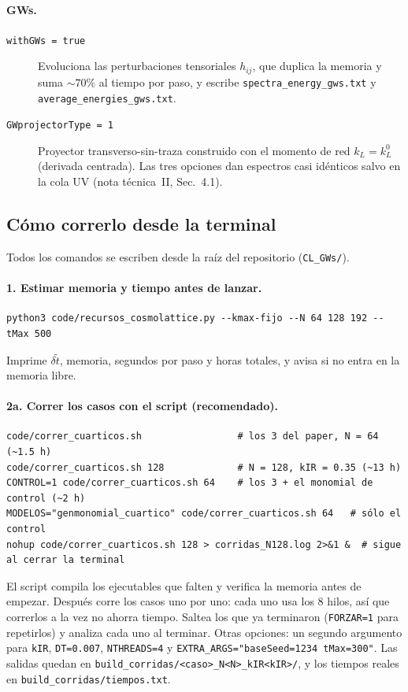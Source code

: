 \documentclass[11pt]{article}
\begin{document}
            \paragraph{GWs.}
            \begin{description}
                \item[\texttt{withGWs = true}] Evoluciona las perturbaciones tensoriales $h_{ij}$, que duplica la memoria y suma $\sim 70\%$ al tiempo por paso, y escribe \texttt{spectra\_energy\_gws.txt} y \texttt{average\_energies\_gws.txt}.
                \item[\texttt{GWprojectorType = 1}] Proyector transverso-sin-traza construido con el momento de red $k_L = k_L^0$ (derivada centrada). Las tres opciones dan espectros casi idénticos salvo en la cola UV (nota técnica~II, Sec.~4.1).
            \end{description}

        \subsection{Cómo correrlo desde la terminal}
            \label{sec:terminal}

            Todos los comandos se escriben desde la raíz del repositorio (\texttt{CL\_GWs/}).

            \paragraph{1. Estimar memoria y tiempo antes de lanzar.}
            {\footnotesize\begin{verbatim}
python3 code/recursos_cosmolattice.py --kmax-fijo --N 64 128 192 --tMax 500
            \end{verbatim}}
            Imprime $\delta\tilde t$, memoria, segundos por paso y horas totales, y avisa si no entra en la memoria libre.

            \paragraph{2a. Correr los casos con el script (recomendado).}
            {\footnotesize\begin{verbatim}
code/correr_cuarticos.sh                 # los 3 del paper, N = 64 (~1.5 h)
code/correr_cuarticos.sh 128             # N = 128, kIR = 0.35 (~13 h)
CONTROL=1 code/correr_cuarticos.sh 64    # los 3 + el monomial de control (~2 h)
MODELOS="genmonomial_cuartico" code/correr_cuarticos.sh 64   # sólo el control
nohup code/correr_cuarticos.sh 128 > corridas_N128.log 2>&1 &  # sigue al cerrar la terminal
            \end{verbatim}}
            El script compila los ejecutables que falten y verifica la memoria antes de empezar. Después corre los casos uno por uno: cada uno usa los 8 hilos, así que correrlos a la vez no ahorra tiempo. Saltea los que ya terminaron (\texttt{FORZAR=1} para repetirlos) y analiza cada uno al terminar. Otras opciones: un segundo argumento para \texttt{kIR}, \texttt{DT=0.007}, \texttt{NTHREADS=4} y \texttt{EXTRA\_ARGS="baseSeed=1234 tMax=300"}. Las salidas quedan en \texttt{build\_corridas/<caso>\_N<N>\_kIR<kIR>/}, y los tiempos reales en \texttt{build\_corridas/tiempos.txt}.
\end{document}
